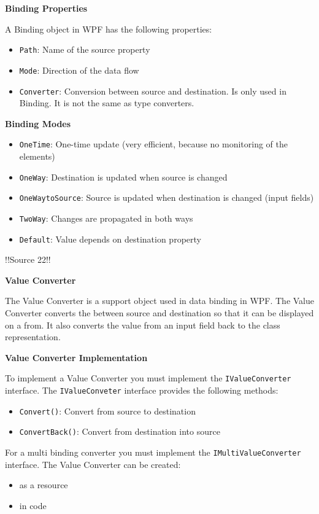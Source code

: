 \documentclass[10pt,twoside,landscape]{article}
\begin{document}
\begin{multicols}{4}
\textbf{Binding Properties}

A Binding object in WPF has the following properties:
\begin{itemize}
\item \texttt{Path}: Name of the source property
\item \texttt{Mode}: Direction of the data flow
\item \texttt{Converter}: Conversion between source and destination.
Is only used in Binding.
It is not the same as type converters.
\end{itemize}

\textbf{Binding Modes}

\begin{itemize}
\item \texttt{OneTime}: One-time update (very efficient, because no monitoring of the elements)
\item \texttt{OneWay}: Destination is updated when source is changed
\item \texttt{OneWaytoSource}: Source is updated when destination is changed (input fields)
\item \texttt{TwoWay}: Changes are propagated in both ways
\item \texttt{Default}: Value depends on destination property
\end{itemize}

!!Source 22!!

\textbf{Value Converter}

The Value Converter is a support object used in data binding in WPF.
The Value Converter converts the between source and destination so that it can be displayed on a from.
It also converts the value from an input field back to the class representation.

\textbf{Value Converter Implementation}

To implement a Value Converter you must implement the \texttt{IValueConverter} interface.
The \texttt{IValueConveter} interface provides the following methods:
\begin{itemize}
\item \texttt{Convert()}: Convert from source to destination
\item \texttt{ConvertBack()}: Convert from destination into source
\end{itemize}


For a multi binding converter you must implement the \texttt{IMultiValueConverter} interface.
The Value Converter can be created:
\begin{itemize}
\item as a resource
\item in code
\end{itemize}



\end{multicols}
\end{document}
